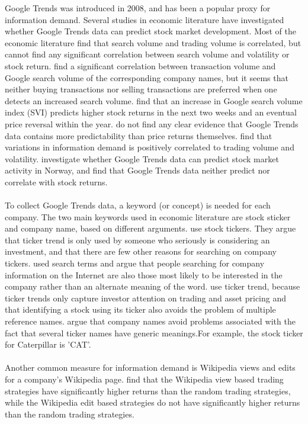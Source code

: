 Google Trends was introduced in 2008, and has been a popular proxy for information demand. Several studies in economic literature have investigated whether Google Trends data can predict stock market development. Most of the economic literature find that search volume and trading volume is correlated, but cannot find any significant correlation between search volume and volatility or stock return. \cite{preis} find a significant correlation between transaction volume and Google search volume of the corresponding company names, but it seems that neither buying transactions nor selling transactions are preferred when one detects an increased search volume. \cite{engelberg} find that an increase in Google search volume index (SVI) predicts higher stock returns in the next two weeks and an eventual price reversal within the year. \cite{challet2014} do not find any clear evidence that Google Trends data contains more predictability than price returns themselves. \cite{vlastakis} find that variations in information demand is positively correlated to trading volume and volatility. \cite{neri} investigate whether Google Trends data can predict stock market activity in Norway, and find that Google Trends data neither predict nor correlate with stock returns. 
\\\\
To collect Google Trends data, a keyword (or concept) is needed for each company. The two main keywords used in economic literature are stock sticker and company name, based on different arguments. \cite{joseph} use stock tickers. They argue that ticker trend is only used by someone who seriously is considering an investment, and that there are few other reasons for searching on company tickers. \cite{bijl} used search terms and argue that people searching for company information on the Internet are also those most likely to be interested in the company rather than an alternate meaning of the word. \cite{engelberg} use ticker trend, because ticker trends only capture investor attention on trading and asset pricing and that identifying a stock using its ticker also avoids the problem of multiple reference names. \cite{vlastakis} argue that company names avoid problems associated with the fact that several ticker names have generic meanings.For example, the stock ticker for Caterpillar is 'CAT'.
\\\\
Another common measure for information demand is Wikipedia views and edits for a company's Wikipedia page. \cite{moat} find that the Wikipedia view based trading strategies have significantly higher returns than the random trading strategies, while the Wikipedia edit based strategies do not have significantly higher returns than the random trading strategies. 
